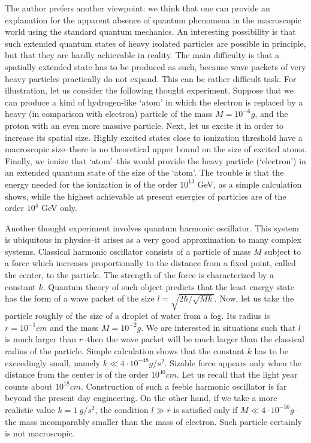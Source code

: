 \documentclass[12pt]{article}
\begin{document}
The author prefers another viewpoint: we think that one can provide an explanation for the apparent absence of quantum phenomena in the macroscopic world using the standard quantum mechanics. An interesting possibility is that such extended quantum states of heavy isolated particles are possible in principle, but that they are hardly achievable in reality. The main difficulty is that a spatially extended state has to be produced as such, because wave packets of very heavy particles practically do not expand. This can be rather difficult task. For illustration, let us consider the following thought experiment. Suppose that we can produce a kind of hydrogen-like `atom' in which the electron is replaced by a heavy (in comparison with electron) particle of the mass $M= 10^{-6} g$, and the proton with an even more massive particle. Next, let us excite it in order to increase its spatial size. Highly excited states close to ionization threshold have a macroscopic size--there is no theoretical upper bound on the size of excited atoms. Finally, we ionize that `atom'--this would provide the heavy particle (`electron') in an extended quantum state of the size of the `atom'. The trouble is that the energy needed for the ionization is of the order $10^{13}$ GeV, as a simple calculation shows, while the highest achievable at present energies of particles are of the order $10^{4}$ GeV only. 

Another thought experiment involves quantum harmonic oscillator. This system is ubiquitous in physics--it arises as a very good approximation to many complex systems. Classical harmonic oscillator consists of a particle of mass $M$ subject to a force which increases proportionally to the distance from a fixed point, called the center, to the particle. The strength of the force is characterized by a constant $k$. Quantum theory of such object predicts that the least energy state has the form of a wave packet of the size $l = \sqrt{2 \hbar/ \sqrt{M k}}$. Now, let us take the particle roughly of the size of a droplet of water from a fog. Its radius is $r= 10^{-1} cm$ and the mass $M= 10^{-2} g$. We are interested in situations such that $l$ is much larger than $r$--then the wave packet will be much larger than the classical radius of the particle. Simple calculation shows that the constant $k$ has to be exceedingly small, namely $k \ll 4\cdot 10^{-48} g/s^2$. Sizable force appears only when the distance from the center is of the order $10^{40} cm$. Let us recall that the light year counts about $10^{18} cm$. Construction of such a feeble harmonic oscillator is far beyond the present day engineering. On the other hand, if we take a more realistic value $k =1 \:g/s^2$, the condition $ l \gg r $ is satisfied only if $M \ll 4 \cdot 10^{-50} g$--the mass incomparably smaller than the mass of electron. Such particle certainly is not macroscopic. 
\end{document}
